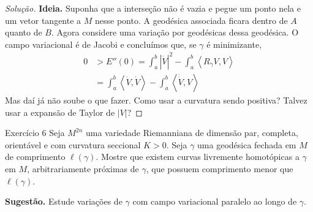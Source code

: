 \begin{proof}[Solução]\leavevmode
	\textbf{Ideia.} Suponha que a interseção não é vazia e pegue um ponto nela e um vetor tangente a \(M\) nesse ponto. A geodésica associada ficara dentro de \(A\) quanto de \(B\). Agora considere uma variação por geodésicas dessa geodésica. O campo variacional é de Jacobi e concluímos que, se \(\gamma\) é minimizante,
	\begin{align*}
	0&> E''(0)=\int_a^b|\dot V|^2- \int_a^b\left<R_{\dot \gamma}V,V\right>\\
	&=\int_a^b\left<\dot V, \dot V\right>-\int_{a}^b \left<\dot \dot V,V\right>
	\end{align*}
	Mas daí já não soube o que fazer. Como usar a curvatura sendo positiva? Talvez usar a expansão de Taylor de \(|V|\)?
\end{proof}

\begin{thing6}{Exercício 6}\label{exer:6}\leavevmode
Seja \(M^{2n}\) uma variedade Riemanniana de dimensão par, completa, orientável e com curvatura seccional \(K>0\). Seja \(\gamma\) uma geodésica fechada em \(M\) de comprimento \(\ell(\gamma)\). Mostre que existem curvas livremente homotópicas a \(\gamma\) em \(M\), arbitrariamente próximas de \(\gamma\), que possuem comprimento menor que \(\ell(\gamma)\).

\textbf{Sugestão.} Estude variações de \(\gamma\) com campo variacional paralelo ao longo de \(\gamma\).
\end{thing6}

